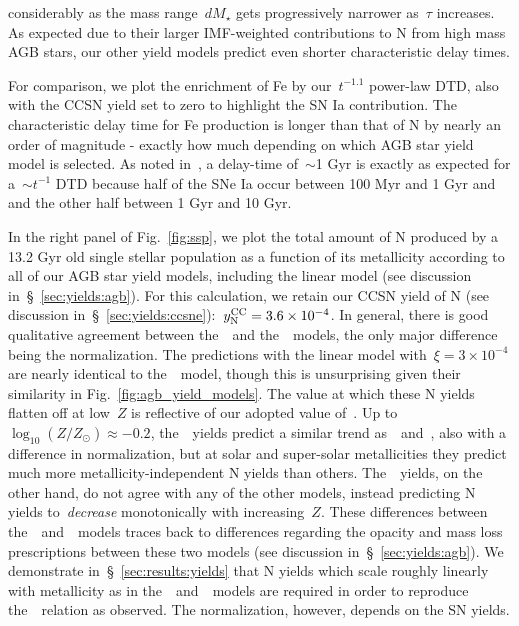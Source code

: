 \documentclass[ms.tex]{subfiles}
\begin{document}
considerably as the mass range~$dM_\star$ gets progressively narrower as~$\tau$
increases.
As expected due to their larger IMF-weighted contributions to N from high mass
AGB stars, our other yield models predict even shorter characteristic delay
times.
\par
For comparison, we plot the enrichment of Fe by our~$t^{-1.1}$ power-law DTD,
also with the CCSN yield set to zero to highlight the SN Ia contribution.
The characteristic delay time for Fe production is longer than that of N by
nearly an order of magnitude - exactly how much depending on which AGB star
yield model is selected.
As noted in~\citet{Johnson2021}, a delay-time of~$\sim$1 Gyr is exactly as
expected for a~$\sim t^{-1}$ DTD because half of the SNe Ia occur between
100 Myr and 1 Gyr and and the other half between 1 Gyr and 10 Gyr.
\par
In the right panel of Fig.~\ref{fig:ssp}, we plot the total amount of N
produced by a 13.2 Gyr old single stellar population as a function of its
metallicity according to all of our AGB star yield models, including the linear
model (see discussion in~\S~\ref{sec:yields:agb}).
For this calculation, we retain our CCSN yield of N (see discussion
in~\S~\ref{sec:yields:ccsne}):~$y_\text{N}^\text{CC} = 3.6\times10^{-4}$.
In general, there is good qualitative agreement between the~\cristallo~and
the~\ventura~models, the only major difference being the normalization.
The predictions with the linear model with~$\xi = 3\times10^{-4}$ are nearly
identical to the~\cristallo~model, though this is unsurprising given their
similarity in Fig.~\ref{fig:agb_yield_models}.
The value at which these N yields flatten off at low~$Z$ is reflective of our
adopted value of~.
Up to~$\log_{10}(Z / Z_\odot) \approx -0.2$, the~\karakas~yields predict a
similar trend as~\cristallo~and~\ventura, also with a difference in
normalization, but at solar and super-solar metallicities they predict much
more metallicity-independent N yields than others.
The~\karakasten~yields, on the other hand, do not agree with any of the other
models, instead predicting N yields to~\textit{decrease} monotonically with
increasing~$Z$.
These differences between the~\karakasten~and~\karakas~models traces back to
differences regarding the opacity and mass loss prescriptions between these
two models (see discussion in~\S~\ref{sec:yields:agb}).
We demonstrate in~\S~\ref{sec:results:yields} that N yields which scale roughly
linearly with metallicity as in the~\cristallo~and~\ventura~models are required
in order to reproduce the~\ohno~relation as observed.
The normalization, however, depends on the SN yields.
\end{document}
